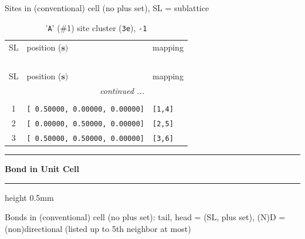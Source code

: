 \documentclass[fleqn,10pt,landscape]{jsarticle}
\begin{document}
\noindent Sites in (conventional) cell (no plus set), SL = sublattice

\renewcommand{\arraystretch}{1.6}
\begin{longtable}[l]{cll}
\captionsetup{justification=raggedright, singlelinecheck=off}
\caption{'\texttt{A}' (\#1) site cluster (\texttt{3e}), \texttt{-1}}
 \\
 \hline \hline
SL & position ($\bm{s})$ & mapping \\ \hline \endfirsthead

\multicolumn{2}{l}{\tablename\ \thetable{}} \\
 \hline \hline
SL & position ($\bm{s})$ & mapping \\ \hline \endhead

 \hline \hline
\multicolumn{2}{r}{\footnotesize\it continued ...} \\ \endfoot

 \hline \hline
\multicolumn{2}{r}{} \\ \endlastfoot

1 & \texttt{[ 0.50000, 0.00000, 0.00000]} & \texttt{[1,4]} \\ \hline
2 & \texttt{[ 0.00000, 0.50000, 0.00000]} & \texttt{[2,5]} \\ \hline
3 & \texttt{[ 0.50000, 0.50000, 0.00000]} & \texttt{[3,6]} \\
\end{longtable}
\vspace{5mm}
\noindent \rule[0.5mm]{5mm}{0.5mm}\hspace{3mm}\textbf{Bond in Unit Cell}\hspace{3mm}\leaders\hrule height 0.5mm\hfill\kern0pt
\vspace{3mm}

\noindent Bonds in (conventional) cell (no plus set): tail, head = (SL, plus set), (N)D = (non)directional (listed up to 5th neighbor at most)
\end{document}
